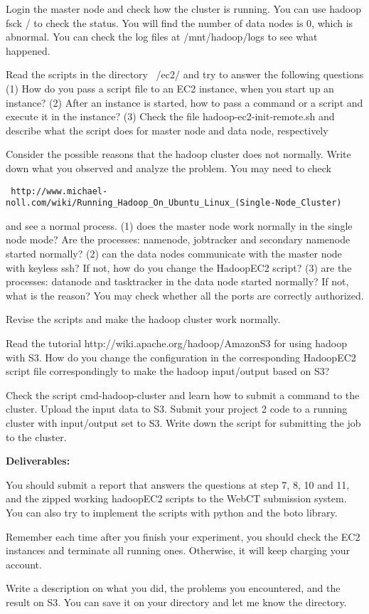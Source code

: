 \documentclass{article}
\begin{document}
Login the master node and check how the cluster is running. You can
use hadoop fsck / to check the status. You will find the number of
data nodes is 0, which is abnormal. You can check the log files at
/mnt/hadoop/logs to see what happened.
 
Read the scripts in the directory ~/ec2/ and try to answer the
following questions\\

(1) How do you pass a script file to an EC2 instance, when you start
up an instance?  (2) After an instance is started, how to pass a
command or a script and execute it in the instance?  (3) Check the
file hadoop-ec2-init-remote.sh and describe what the script does for
master node and data node, respectively
 
Consider the possible reasons that the hadoop cluster does not
normally. Write down what you observed and analyze the problem. You
may need to check
\begin{verbatim}
 http://www.michael-noll.com/wiki/Running_Hadoop_On_Ubuntu_Linux_(Single-Node_Cluster)
\end{verbatim}
and see a normal process.  (1) does the master node work normally in
the single node mode? Are the processes: namenode, jobtracker and
secondary namenode started normally?  (2) can the data nodes
communicate with the master node with keyless ssh? If not, how do you
change the HadoopEC2 script?  (3) are the processes: datanode and
tasktracker in the data node started normally? If not, what is the
reason? You may check whether all the ports are correctly authorized.
 
Revise the scripts and make the hadoop cluster work normally.
 
Read the tutorial http://wiki.apache.org/hadoop/AmazonS3 for using
hadoop with S3. How do you change the configuration in the
corresponding HadoopEC2 script file correspondingly to make the hadoop
input/output based on S3?
 
Check the script cmd-hadoop-cluster and learn how to submit a command
to the cluster. Upload the input data to S3. Submit your project 2
code to a running cluster with input/output set to S3. Write down the
script for submitting the job to the cluster.
 
\textbf{Deliverables:}

You should submit a report that answers the questions at
step 7, 8, 10 and 11, and the zipped working hadoopEC2 scripts to the
WebCT submission system.  You can also try to implement the scripts
with python and the boto library.
 
Remember each time after you finish your experiment, you should check
the EC2 instances and terminate all running ones. Otherwise, it will
keep charging your account.
 
Write a description on what you did, the problems you encountered, and
the result on S3. You can save it on your directory and let me know
the directory.
 
\end{document}
